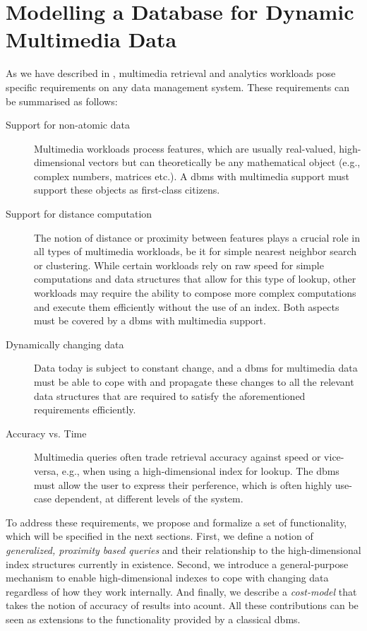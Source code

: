 \chapter{Modelling a Database for Dynamic Multimedia Data}
\label{chapter:system_model}

As we have described in , multimedia retrieval and analytics workloads pose specific requirements on any data management system. These requirements can be summarised as follows:

\begin{description}
    \item[Support for non-atomic data] Multimedia workloads process features, which are usually real-valued, high-dimensional vectors but can theoretically be any mathematical object (e.g., complex numbers, matrices etc.). A \acrshort{dbms} with multimedia support must support these objects as first-class citizens.
    \item[Support for distance computation] The notion of distance or proximity between features plays a crucial role in all types of multimedia workloads, be it for simple nearest neighbor search or clustering. While certain workloads rely on raw speed for simple computations and data structures that allow for this type of lookup, other workloads may require the ability to compose more complex computations and execute them efficiently without the use of an index. Both aspects must be covered by a \acrshort{dbms} with multimedia support.
    \item[Dynamically changing data] Data today is subject to constant change, and a \acrshort{dbms} for multimedia data must be able to cope with and propagate these changes to all the relevant data structures that are required to satisfy the aforementioned requirements efficiently.
    \item[Accuracy vs. Time] Multimedia queries often trade retrieval accuracy against speed or vice-versa, e.g., when using a high-dimensional index for lookup. The \acrshort{dbms} must allow the user to express their perference, which is often highly use-case dependent, at different levels of the system.
\end{description}

To address these requirements, we propose and formalize a set of functionality, which will be specified in the next sections. First, we define a notion of \emph{generalized, proximity based queries} and their relationship to the high-dimensional index structures currently in existence. Second, we introduce a general-purpose mechanism to enable high-dimensional indexes to cope with changing data regardless of how they work internally. And finally, we describe a \emph{cost-model} that takes the notion of accuracy of results into acount. All these contributions can be seen as extensions to the functionality provided by a classical \acrshort{dbms}.

